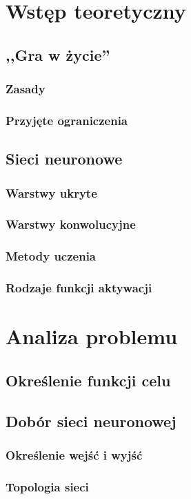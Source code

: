 \chapter{Wstęp teoretyczny}
    \section{,,Gra w życie''}
        \subsection{Zasady}
        \subsection{Przyjęte ograniczenia}
    \section{Sieci neuronowe}
        \subsection{Warstwy ukryte}
        \subsection{Warstwy konwolucyjne}
        \subsection{Metody uczenia}
        \subsection{Rodzaje funkcji aktywacji}
\chapter{Analiza problemu}
    \section{Określenie funkcji celu}
    \section{Dobór sieci neuronowej}
        \subsection{Określenie wejść i wyjść}
        \subsection{Topologia sieci}
